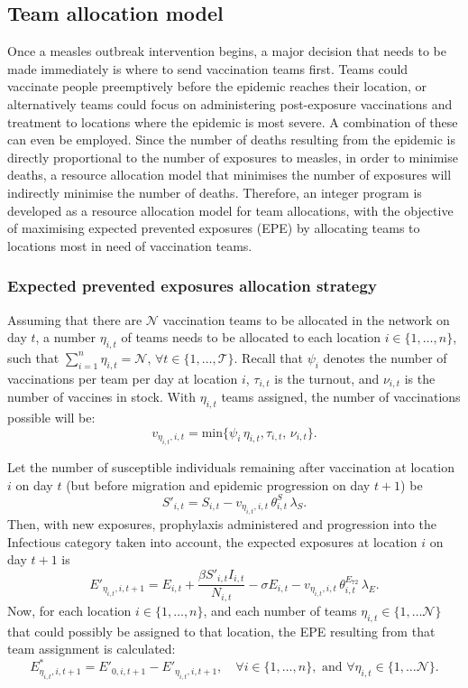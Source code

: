 \subsection{Team allocation model} %
\label{sec:team_strat}
Once a measles outbreak intervention begins, a major decision that needs to be made immediately is where to send vaccination teams first. Teams could vaccinate people preemptively before the epidemic reaches their location, or alternatively teams could focus on administering post-exposure vaccinations and treatment to locations where the epidemic is most severe. A combination of these can even be employed. Since the number of deaths resulting from the epidemic is directly proportional to the number of exposures to measles, in order to minimise deaths, a resource allocation model that minimises the number of exposures will indirectly minimise the number of deaths. Therefore, an integer program is developed as a resource allocation model for team allocations, with the objective of maximising expected prevented exposures (EPE) by allocating teams to locations most in need of vaccination teams. 

\subsubsection{Expected prevented exposures allocation strategy}
\label{meth:teamEPE}
Assuming that there are $\mathcal{N}$ vaccination teams to be allocated in the network on day $t$, a number $\eta_{i,t}$ of teams needs to be allocated to each location $i \in \{1, \dots, n\}$, such that $\sum_{i=1}^{n} \eta_{i,t} = \mathcal{N}, \, \forall{t} \in \{1, \dots, \mathcal{T}\}$.  Recall that $\psi_{i}$ denotes the number of vaccinations per team per day at location $i$, $\tau_{i,t}$ is the turnout, and $\nu_{i,t}$ is the number of vaccines in stock. With $\eta_{i,t}$ teams assigned, the number of vaccinations possible will be: $$v_{\eta_{i,t},i,t}  = \text{min} \{\psi_{i} \,\eta_{i,t}, \tau_{i,t}, \, \nu_{i,t} \}.$$ 

Let the number of susceptible individuals remaining after vaccination at location $i$ on day $t$ (but before migration and epidemic progression on day $t+1$) be $$S'_{i,t} = S_{i,t} - v_{\eta_{i,t},i,t} \, \theta^{S}_{i,t} \, \lambda_{S}.$$
Then, with new exposures, prophylaxis administered and progression into the Infectious category taken into account, the expected exposures at location $i$ on day $t+1$ is $$E'_{\eta_{i,t},i,t+1} = E_{i,t} + \frac{\beta S'_{i,t} I_{i,t}}{N_{i,t}} - \sigma E_{i,t} - v_{\eta_{i,t},i,t} \, \theta^{E_{72}}_{i,t} \, \lambda_{E}.$$
Now, for each location $i \in \{1,\dots,n\}$, and each number of teams $\eta_{i,t} \in \{1,\dots \mathcal{N}\}$ that could possibly be assigned to that location, the EPE resulting from that team assignment is calculated:
$$E^{*}_{\eta_{i,t},i,t+1} = E'_{0,i,t+1} - E'_{\eta_{i,t},i,t+1}, \quad \forall{i} \in \{1, \dots, n \}, \text{ and } \forall{\eta_{i,t}} \in \{1,\dots \mathcal{N} \}.$$

